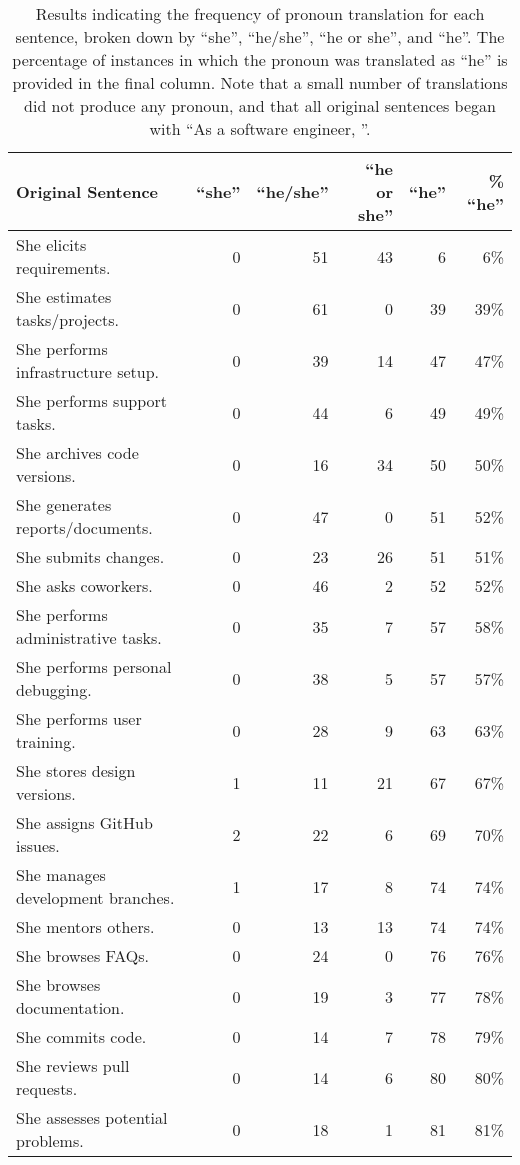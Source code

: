 \documentclass[10pt,conference]{IEEEtran}
\begin{document}
\begin{sloppy}
\begin{table*}
\centering
\caption{Results indicating the frequency of pronoun translation for each sentence, broken down by ``she'', ``he/she'', ``he or she'', and ``he''. The percentage of instances in which the pronoun was translated as ``he'' is provided in the final column. Note that a small number of translations did not produce any pronoun, and that all original sentences began with ``As a software engineer, ''.}
\label{tab:results}
\begin{tabular}{l|rrrr|r}
\toprule
\textbf{Original Sentence} & \textbf{``she''} & \textbf{``he/she''} & \textbf{``he or she''} & \textbf{``he''} & \% \textbf{``he''}\\
\midrule
She elicits requirements. & 0 & 51 & 43 & 6 & 6\% \\
She estimates tasks/projects. & 0 & 61 & 0 & 39 & 39\% \\
She performs infrastructure setup. & 0 & 39 & 14 & 47 & 47\% \\
She performs support tasks. & 0 & 44 & 6 & 49 & 49\% \\
She archives code versions. & 0 & 16 & 34 & 50 & 50\% \\
She generates reports/documents. & 0 & 47 & 0 & 51 & 52\% \\
She submits changes. & 0 & 23 & 26 & 51 & 51\% \\
She asks coworkers. & 0 & 46 & 2 & 52 & 52\% \\
She performs administrative tasks. & 0 & 35 & 7 & 57 & 58\% \\
She performs personal debugging. & 0 & 38 & 5 & 57 & 57\% \\
She performs user training. & 0 & 28 & 9 & 63 & 63\% \\
She stores design versions. & 1 & 11 & 21 & 67 & 67\% \\
She assigns GitHub issues. & 2 & 22 & 6 & 69 & 70\% \\
She manages development branches. & 1 & 17 & 8 & 74 & 74\% \\
She mentors others. & 0 & 13 & 13 & 74 & 74\% \\
She browses FAQs. & 0 & 24 & 0 & 76 & 76\% \\
She browses documentation. & 0 & 19 & 3 & 77 & 78\% \\
She commits code. & 0 & 14 & 7 & 78 & 79\% \\
She reviews pull requests. & 0 & 14 & 6 & 80 & 80\% \\
She assesses potential problems. & 0 & 18 & 1 & 81 & 81\% \\

\end{tabular}
\end{table*}
\end{sloppy}
\end{document}
